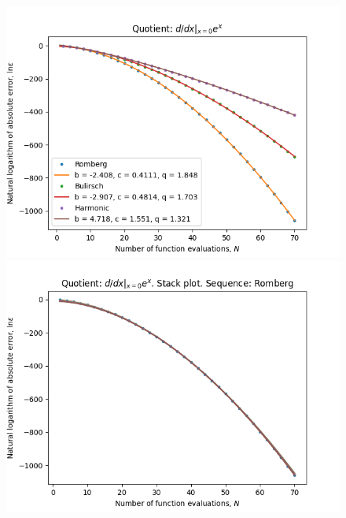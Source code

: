 \begin{figure}[H]
\centering
\begin{minipage}{0.45\textwidth}
\centering
\includegraphics[scale=0.45]{../results/diff_quot_plots/exp_0_hp_trend.png}
\end{minipage}
\begin{minipage}{0.45\textwidth}
\centering
\includegraphics[scale=0.45]{../results/diff_quot_plots/exp_0_hp_romberg_stack.png}
\end{minipage}
\end{figure}

